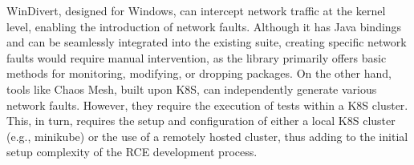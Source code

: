 WinDivert, designed for Windows, can intercept network traffic at the kernel level, enabling the introduction of network faults. Although it has Java bindings and can be seamlessly integrated into the existing suite, creating specific network faults would require manual intervention, as the library primarily offers basic methods for monitoring, modifying, or dropping packages. On the other hand, tools like Chaos Mesh, built upon \ac{K8S}, can independently generate various network faults. However, they require the execution of tests within a \ac{K8S} cluster. This, in turn, requires the setup and configuration of either a local \ac{K8S} cluster (e.g., minikube) or the use of a remotely hosted cluster, thus adding to the initial setup complexity of the \ac{RCE} development process.
